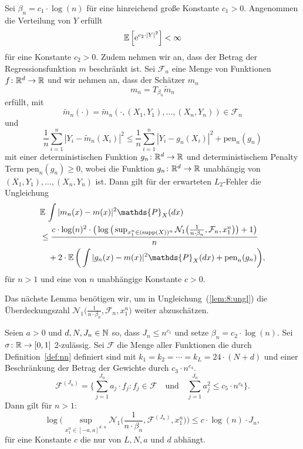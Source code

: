   \begin{lem}
  \label{lem:8}
Sei $\beta_n = c_1 \cdot \log(n)$ für eine hinreichend große Konstante $c_1 > 0$. Angenommen die Verteilung von $Y$ erfüllt 
$$ \mathbb{E}\,\Big[\mathrm{e}^{c_2 \cdot |Y|^2}\Big] < \infty$$
für eine Konstante $c_2 > 0.$ Zudem nehmen wir an, dass der Betrag der Regressionsfunktion $m$ beschränkt ist. Sei $\mathcal{F}_n$ eine Menge von Funktionen $f\colon \mathbb{R}^d \to \mathbb{R}$ und wir nehmen an, dass der Schätzer $m_n$ 
$$m_n = T_{\beta_n}\tilde{m}_n$$ 
erfüllt, mit 
$$\tilde{m}_n(\cdot) = \tilde{m}_n(\cdot,(X_1, Y_1),\dots,(X_n, Y_n)) \in \mathcal{F}_n$$
und 
$$\frac{1}{n} \sum_{i = 1}^n |Y_i - \tilde{m}_n(X_i)|^2 \leq \frac{1}{n}\sum_{i = 1}^n |Y_i - g_{n}(X_i)|^2 + \mathrm{pen}_n(g_n)$$
mit einer deterministischen Funktion $g_{n}\colon \mathbb{R}^d \to \mathbb{R}$ und deterministischem Penalty Term $\mathrm{pen}_n(g_{n}) \geq 0$, wobei die Funktion $g_{n}\colon \mathbb{R}^d \to \mathbb{R}$ unabhängig von $(X_1, Y_1),\dots,(X_n,Y_n)$ ist.
Dann gilt für der erwarteten $L_2$-Fehler die Ungleichung
\begin{equation}
\label{lem:8:ungl}
\begin{split}
& \E \int |m_n(x) - m(x)|^2 \mathds{P}_X(dx) \\
& \leq \frac{c \cdot \log(n)^2 \cdot \big(\log\big(\sup_{x_1^n \in (\supp(X))^n}\mathcal{N}_1\big(\frac{1}{n \cdot \beta_n},\mathcal{F}_n,x_1^n\big)\big) + 1\big)}{n} \\
& \quad + 2 \cdot \E\bigg(\int |g_{n}(x) - m(x)|^2 \mathds{P}_X(dx) + \mathrm{pen}_n(g_{n})\bigg),
\end{split}
\end{equation}
für $n > 1$ und eine von $n$ unabhängige Konstante $c > 0$.
  \end{lem}
Das nächste Lemma benötigen wir, um in Ungleichung~(\ref{lem:8:ungl}) die Überdeckungszahl $\mathcal{N}_1\big(\frac{1}{n \cdot \beta_n},\mathcal{F}_n,x_1^n\big)$ weiter abzuschätzen.
\begin{lem}
\label{lem:9}
Seien $a > 0$ und $d, N, J_n \in \mathbb{N}$ so, dass $J_n \leq n^{c_{1}}$ und setze $\beta_n = c_2 \cdot \log(n).$
Sei $\sigma\colon \mathbb{R} \to [0, 1]$ 2-zulässig. Sei $\mathcal{F}$ die Menge aller Funktionen die durch Definition~\ref{def:nn} definiert sind mit $k_1 = k_2 = \cdots = k_L = 24 \cdot (N + d)$ und einer Beschränkung der Betrag der Gewichte durch $c_{3} \cdot n^{c_{4}}$.
$$ \mathcal{F}^{(J_n)} = \biggl\{\sum_{j = 1}^{J_n} a_j \cdot f_j : f_j \in \mathcal{F} \quad \text{und} \quad \sum_{j = 1}^{J_n} a_j^2 \leq c_{5} \cdot n^{c_{6}}\biggr\}.$$
Dann gilt für $n > 1:$
$$\log\bigg(\sup_{x_1^n\in[-a,a]^{d \cdot n}} \mathcal{N}_1\bigg(\frac{1}{n \cdot \beta_n}, \mathcal{F}^{(J_n)},x_1^n\bigg)\bigg) \leq c \cdot \log(n) \cdot J_n,$$
für eine Konstante $c$ die nur von $L, N, a$ und $d$ abhängt.
\end{lem}

